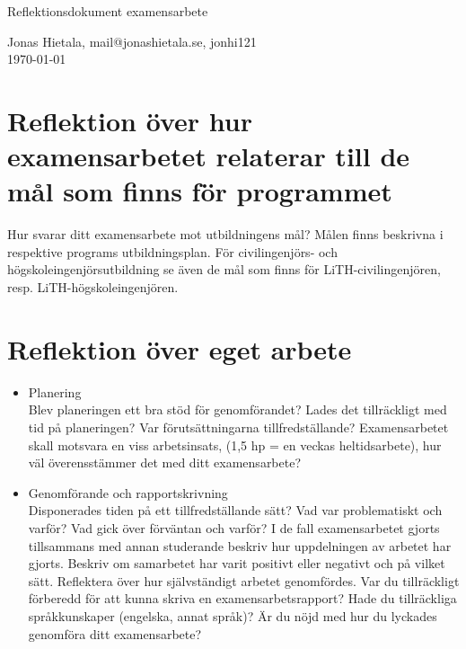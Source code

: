 \documentclass[11pt]{article}
\begin{document}
\begin{center}



{ \LARGE Reflektionsdokument examensarbete \\[0.4cm] }

Jonas Hietala, mail@jonashietala.se, jonhi121 \\[0.2cm]

\today

\end{center}


\section*{Reflektion över hur examensarbetet relaterar till de mål som finns för programmet}

Hur svarar ditt examensarbete mot utbildningens mål?
Målen finns beskrivna i respektive programs utbildningsplan. För civilingenjörs- och högskoleingenjörsutbildning se även de mål som finns för LiTH-civilingenjören, resp. LiTH-högskoleingenjören.


\section*{Reflektion över eget arbete}

\begin{itemize}
    \item Planering \\

        Blev planeringen ett bra stöd för genomförandet? Lades det tillräckligt med tid på planeringen? Var förutsättningarna tillfredställande? Examensarbetet skall motsvara en viss arbetsinsats, (1,5 hp = en veckas heltidsarbete), hur väl överensstämmer det med ditt examensarbete?

    \item Genomförande och rapportskrivning \\

        Disponerades tiden på ett tillfredställande sätt? Vad var problematiskt och varför? Vad gick över förväntan och varför?
        I de fall examensarbetet gjorts tillsammans med annan studerande beskriv hur uppdelningen av arbetet har gjorts. Beskriv om samarbetet har varit positivt eller negativt och på vilket sätt. Reflektera över hur självständigt arbetet genomfördes. Var du tillräckligt förberedd för att kunna skriva en examensarbetsrapport? Hade du tillräckliga språkkunskaper (engelska, annat språk)? Är du nöjd med hur du lyckades genomföra ditt examensarbete? 
\end{itemize}
\end{document}
